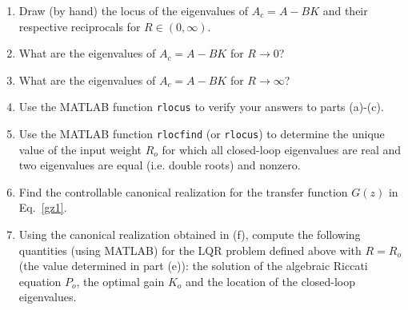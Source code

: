 \begin{enumerate}
    \item
    Draw (by hand) the locus of the eigenvalues of $A_c = A - BK$ and their respective reciprocals for $R \in (0,\infty)$.

    \item
    What are the eigenvalues of $A_c = A - BK$ for $R \to 0$?

    \item
    What are the eigenvalues of $A_c = A - BK$ for $R \to \infty$?

    \item
    Use the MATLAB function {\tt rlocus} to verify your answers to parts (a)-(c).

    \item
    Use the MATLAB function {\tt rlocfind} (or {\tt rlocus}) to
    determine the unique value of the input weight $R_o$ for which all closed-loop eigenvalues are real and two eigenvalues are equal (i.e. double roots) and nonzero.

    \item
    Find the controllable canonical realization for the transfer function $G(z)$ in Eq.~\eqref{gz1}.

    \item
    Using the canonical realization obtained in (f), compute the following quantities (using MATLAB) for the LQR problem defined above with $R = R_o$ (the value determined in part (e)): the solution of the algebraic Riccati equation $P_o$, the optimal gain $K_o$ and the location of the closed-loop eigenvalues.


\end{enumerate}
